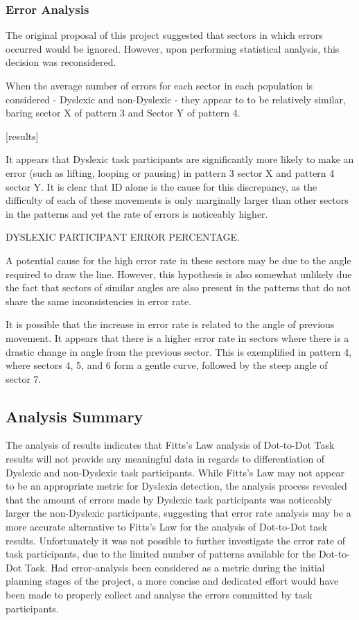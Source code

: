 	\subsubsection{Error Analysis}
		The original proposal of this project suggested that sectors in which errors occurred would be ignored. However, upon performing statistical analysis, this decision was reconsidered.
		
		When the average number of errors for each sector in each population is considered - Dyslexic and non-Dyslexic - they appear to to be relatively similar, baring sector X of pattern 3 and Sector Y of pattern 4.
		
		[results]
		
		It appears that Dyslexic task participants are significantly more likely to make an error (such as lifting, looping or pausing) in pattern 3 sector X and pattern 4 sector Y. It is clear that ID alone is the cause for this discrepancy, as the difficulty of each of these movements is only marginally larger than other sectors in the patterns and yet the rate of errors is noticeably higher.
		
		DYSLEXIC PARTICIPANT ERROR PERCENTAGE.
		
		A potential cause for the high error rate in these sectors may be due to the angle required to draw the line. However, this hypothesis is also somewhat unlikely due the fact that sectors of similar angles are also present in the patterns that do not share the same inconsistencies in error rate. 
		
		It is possible that the increase in error rate is related to the angle of previous movement. It appears that there is a higher error rate in sectors where there is a drastic change in angle from the previous sector. This is exemplified in pattern 4, where sectors 4, 5, and 6 form a gentle curve, followed by the steep angle of sector 7.
		
	\subsection{Analysis Summary}
		The analysis of results indicates that Fitts’s Law analysis of Dot-to-Dot Task results will not provide any meaningful data in regards to differentiation of Dyslexic and non-Dyslexic task participants. While Fitts’s Law may not appear to be an appropriate metric for Dyslexia detection, the analysis process revealed that the amount of errors made by Dyslexic task participants was noticeably larger the non-Dyslexic participants, suggesting that error rate analysis may be a more accurate alternative to Fitts’s Law for the analysis of Dot-to-Dot task results. Unfortunately it was not possible to further investigate the error rate of task participants, due to the limited number of patterns available for the Dot-to-Dot Task. Had error-analysis been considered as a metric during the initial planning stages of the project, a more concise and dedicated effort would have been made to properly collect and analyse the errors committed by task participants.	
\newpage